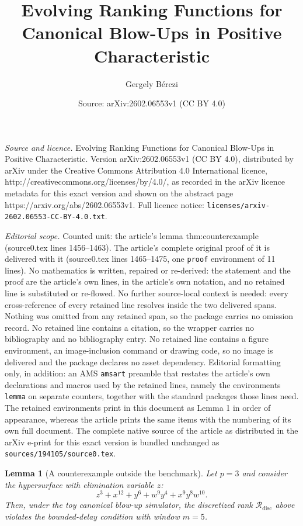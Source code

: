 \documentclass[10pt,a4paper]{amsart}
\title{Evolving Ranking Functions for Canonical Blow-Ups in Positive Characteristic}
\author{Gergely B\'erczi}
\date{Source: arXiv:2602.06553v1 (CC BY 4.0)}
\newtheorem{lemma}{Lemma}
\begin{document}
\maketitle

\noindent\emph{Source and licence.} Evolving Ranking Functions for Canonical Blow-Ups in Positive Characteristic. Version arXiv:2602.06553v1 (CC BY 4.0), distributed by arXiv under the Creative Commons Attribution 4.0 International licence, http://creativecommons.org/licenses/by/4.0/, as recorded in the arXiv licence metadata for this exact version and shown on the abstract page https://arxiv.org/abs/2602.06553v1. Full licence notice: \texttt{licenses/arxiv-2602.06553-CC-BY-4.0.txt}.\par\smallskip

\noindent\textit{Editorial scope.} Counted unit: the article's lemma thm:counterexample (source0.tex lines 1456--1463). The article's complete original proof of it is delivered with it (source0.tex lines 1465--1475, one \texttt{proof} environment of 11 lines). No mathematics is written, repaired or re-derived: the statement and the proof are the article's own lines, in the article's own notation, and no retained line is substituted or re-flowed.  No further source-local context is needed: every cross-reference of every retained line resolves inside the two delivered spans.  Nothing was omitted from any retained span, so the package carries no omission record.  No retained line contains a citation, so the wrapper carries no bibliography and no bibliography entry.  No retained line contains a figure environment, an image-inclusion command or drawing code, so no image is delivered and the package declares no asset dependency.  Editorial formatting only, in addition: an AMS \texttt{amsart} preamble that restates the article's own declarations and macros used by the retained lines, namely the environments \texttt{lemma} on separate counters, together with the standard packages those lines need.  The retained environments print in this document as Lemma 1 in order of appearance, whereas the article prints the same items with the numbering of its own full document.  The complete native source of the article as distributed in the arXiv e-print for this exact version is bundled unchanged as \texttt{sources/194105/source0.tex}.
\begin{lemma}[A counterexample outside the benchmark]\label{thm:counterexample}
Let $p=3$ and consider the hypersurface with elimination variable $z$:
\[
z^3 + x^{12} + y^{6} + w^{9}y^{4} + x^{9}y^{8}w^{10}.
\]
Then, under the toy canonical blow-up simulator, the discretized rank
$\mathcal R_{\mathrm{disc}}$ above violates the bounded-delay condition with window $m=5$.
\end{lemma}
\end{document}
